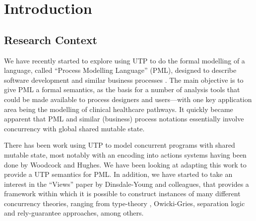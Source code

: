 \section{Introduction}\label{sec:Intro}

\subsection{Research Context}\label{ssec:context}

We have recently started to explore using UTP
to do the  formal modelling of a language,
called ``Process Modelling Language'' (PML),
designed to describe software development and similar business
processes \cite{DBLP:journals/infsof/AtkinsonWN07}.
The main objective is to give PML a formal semantics,
as the basis for a number of analysis tools that could be made available
to process designers and users---with one key application
area being the modelling of clinical healthcare pathways.
It quickly became apparent that PML and similar (business) process
notations essentially involve concurrency with global shared mutable state.

There has been work using UTP
to model concurrent programs with shared mutable state,
most notably
with an encoding into actions systems having been done by
Woodcock and Hughes\cite{DBLP:conf/icfem/WoodcockH02}.
We have been looking at adapting this work to provide a UTP semantics
for PML.
In addition, we have started to take an interest in the ``Views'' paper
by Dinsdale-Young and colleagues\cite{conf/popl/Dinsdale-YoungBGPY13},
that provides a framework within which it is possible
to construct instances of many different concurrency theories,
ranging from
type-theory \cite{tal-toplas,Smit00b,journals/fuin/AhmedFM07},
Owicki-Gries\cite{Owicki76},
separation logic\cite{conf/lics/CalcagnoOY07}
and rely-guarantee\cite{Jones83}
approaches,
among others.

